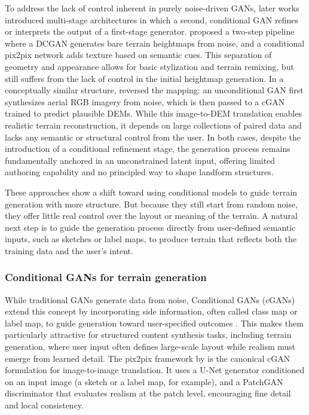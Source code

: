 To address the lack of control inherent in purely noise-driven GANs, later works introduced multi-stage architectures in which a second, conditional GAN refines or interprets the output of a first-stage generator. \citep{Beckham2017} proposed a two-step pipeline where a DCGAN generates bare terrain heightmaps from noise, and a conditional pix2pix network adds texture based on semantic cues. This separation of geometry and appearance allows for basic stylization and terrain remixing, but still suffers from the lack of control in the initial heightmap generation. In a conceptually similar structure, \citep{Panagiotou2020} reversed the mapping: an unconditional GAN first synthesizes aerial RGB imagery from noise, which is then passed to a cGAN trained to predict plausible DEMs. While this image-to-DEM translation enables realistic terrain reconstruction, it depends on large collections of paired data and lacks any semantic or structural control from the user. In both cases, despite the introduction of a conditional refinement stage, the generation process remains fundamentally anchored in an unconstrained latent input, offering limited authoring capability and no principled way to shape landform structures.

These approaches show a shift toward using conditional models to guide terrain generation with more structure. But because they still start from random noise, they offer little real control over the layout or meaning of the terrain. A natural next step is to guide the generation process directly from user-defined semantic inputs, such as sketches or label maps, to produce terrain that reflects both the training data and the user's intent.


\subsubsection{Conditional GANs for terrain generation}
\label{sec:coral-island_sota-cGAN}

While traditional GANs generate data from noise, Conditional GANs (cGANs) extend this concept by incorporating side information, often called class map or label map, to guide generation toward user-specified outcomes \cite{Mirza2014}. This makes them particularly attractive for structured content synthesis tasks, including terrain generation, where user input often defines large-scale layout while realism must emerge from learned detail. The pix2pix framework by \citep{Isola2017} is the canonical cGAN formulation for image-to-image translation. It uses a U-Net generator conditioned on an input image (a sketch or a label map, for example), and a PatchGAN discriminator that evaluates realism at the patch level, encouraging fine detail and local consistency.

